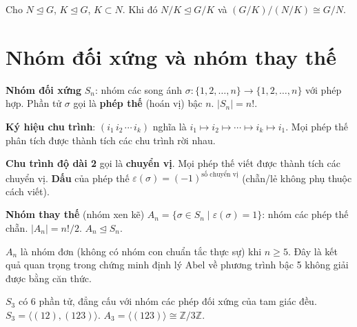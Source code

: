 \documentclass[12pt,a4paper]{article}
\begin{document}
\begin{dinhly}[title={Định lý đồng cấu thứ ba}]
  Cho $N \trianglelefteq G$, $K \trianglelefteq G$, $K \subset N$. Khi đó $N/K \trianglelefteq G/K$ và $(G/K)/(N/K) \cong G/N$.
\end{dinhly}

\section{Nhóm đối xứng và nhóm thay thế}

\begin{dinhnghia}
  \textbf{Nhóm đối xứng} $S_n$: nhóm các song ánh $\sigma: \{1,2,\ldots,n\} \to \{1,2,\ldots,n\}$ với phép hợp. Phần tử $\sigma$ gọi là \textbf{phép thế} (hoán vị) bậc $n$. $|S_n| = n!$.
\end{dinhnghia}

\begin{dinhnghia}
  \textbf{Ký hiệu chu trình}: $(i_1 \, i_2 \, \cdots \, i_k)$ nghĩa là $i_1 \mapsto i_2 \mapsto \cdots \mapsto i_k \mapsto i_1$. Mọi phép thế phân tích được thành tích các chu trình rời nhau.
\end{dinhnghia}

\begin{dinhnghia}
  \textbf{Chu trình độ dài 2} gọi là \textbf{chuyển vị}. Mọi phép thế viết được thành tích các chuyển vị. \textbf{Dấu} của phép thế $\varepsilon(\sigma) = (-1)^{\text{số chuyển vị}}$ (chẵn/lẻ không phụ thuộc cách viết).
\end{dinhnghia}

\begin{dinhnghia}
  \textbf{Nhóm thay thế} (nhóm xen kẽ) $A_n = \{\sigma \in S_n \mid \varepsilon(\sigma) = 1\}$: nhóm các phép thế chẵn. $|A_n| = n!/2$. $A_n \trianglelefteq S_n$.
\end{dinhnghia}

\begin{dinhly}
  $A_n$ là nhóm đơn (không có nhóm con chuẩn tắc thực sự) khi $n \ge 5$. Đây là kết quả quan trọng trong chứng minh định lý Abel về phương trình bậc 5 không giải được bằng căn thức.
\end{dinhly}

\begin{vidu}
  $S_3$ có 6 phần tử, đẳng cấu với nhóm các phép đối xứng của tam giác đều. $S_3 = \langle (12), (123) \rangle$. $A_3 = \langle (123) \rangle \cong \mathbb{Z}/3\mathbb{Z}$.
\end{vidu}
\end{document}

